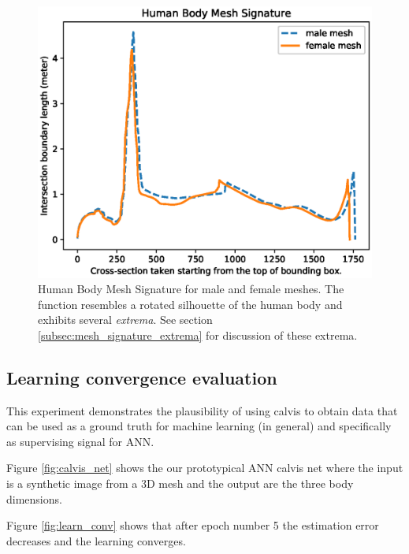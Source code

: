 \documentclass[runningheads]{llncs}
\begin{document}
\begin{figure}[h]
	\begin{center}
		\includegraphics[width=\linewidth]{Figure_1.eps}
	\end{center}
	\caption{Human Body Mesh Signature for male and female meshes. The 
		function resembles a rotated silhouette of the human body and exhibits 
		several \textit{extrema}. See section 
		\ref{subsec:mesh_signature_extrema} for discussion of these extrema.}
	\label{fig:qualitative_eval}
\end{figure}

\subsection{Learning convergence evaluation}\label{subsec:learn_conv}
This experiment demonstrates the plausibility of using calvis to obtain data 
that can be used as a ground truth for machine learning (in general) and 
specifically as supervising signal for ANN.

Figure \ref{fig:calvis_net} shows the our prototypical ANN calvis net where the 
input is a synthetic image from a 3D mesh and the output are the three body 
dimensions.

Figure \ref{fig:learn_conv} shows that after epoch number 5 the estimation 
error decreases and the learning converges.
\end{document}
